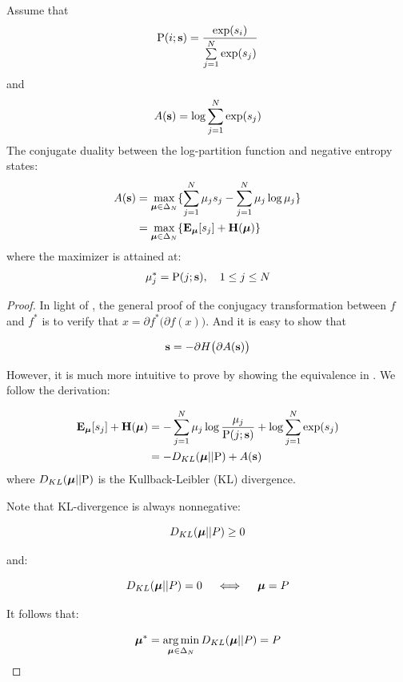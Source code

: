 \begin{lem} \label{lem::bk-cd}
  Assume that
  $$\mathrm{P}(i; \mathbf{s}) = \frac{\exp(s_i)}{\sum\limits_{j=1}^N \exp(s_j)}$$
  and
  $$A(\mathbf{s}) = \log \sum\limits_{j = 1}^N \exp(s_j)$$
  The conjugate duality between the log-partition function and negative entropy
  states:
  \begin{align}
    A(\mathbf{s}) &= \max\limits_{\boldsymbol{\mu} \in \Delta_N}
                    \{ \sum\limits_{j=1}^N \mu_j s_j -
                       \sum\limits_{j=1}^N \mu_j \log \mu_j \} \nonumber \\
           &= \max\limits_{\boldsymbol{\mu} \in \Delta_N}
                    \{ \mathbf{E}_{\boldsymbol{\mu}} [s_j] + \mathbf{H}(\boldsymbol{\mu}) \} \label{eq::bk-cd}
  \end{align}
  where the maximizer is attained at:
  \begin{align}
    \mu_j^* = \mathrm{P}(j; \mathbf{s}), \quad 1 \le j \le N \label{eq::bk-cd_sol}
  \end{align}
\end{lem}
\begin{proof}

  In light of , the general proof of the
  conjugacy transformation between $f$ and $f^*$ is to verify that $x = \partial
  f^* \big( \partial f(x) \big)$. And it is easy to show that

  $$\mathbf{s} = -\partial H \big(\partial A (\mathbf{s}) \big)$$

  However, it is much more intuitive to prove by showing the equivalence in
  . We follow the derivation:

  \begin{align*}
    \mathbf{E}_{\boldsymbol{\mu}}[s_j] + \mathbf{H}(\boldsymbol{\mu})
      &= -\sum\limits_{j=1}^N \mu_j \log \frac{\mu_j }{ \mathrm{P}(j; \mathbf{s}) } +
          \log\sum\limits_{j=1}^N \exp(s_j) \nonumber \\
      &= -D_{KL}(\boldsymbol{\mu} || \mathrm{P}) + A(\mathbf{s})
  \end{align*}
where $D_{KL}(\boldsymbol{\mu} || \mathrm{P})$ is the Kullback-Leibler (KL) divergence.

Note that KL-divergence is always nonnegative:

$$D_{KL}(\boldsymbol{\mu} || P) \ge 0$$

and:

$$D_{KL}(\boldsymbol{\mu} || P) = 0  \quad\iff\quad \boldsymbol{\mu} = P $$

It follows that:

$$\boldsymbol{\mu}^* = \operatorname*{arg\,min}\limits_{\boldsymbol{\mu} \in \Delta_N} D_{KL}(\boldsymbol{\mu} || P) = P$$

\end{proof}

